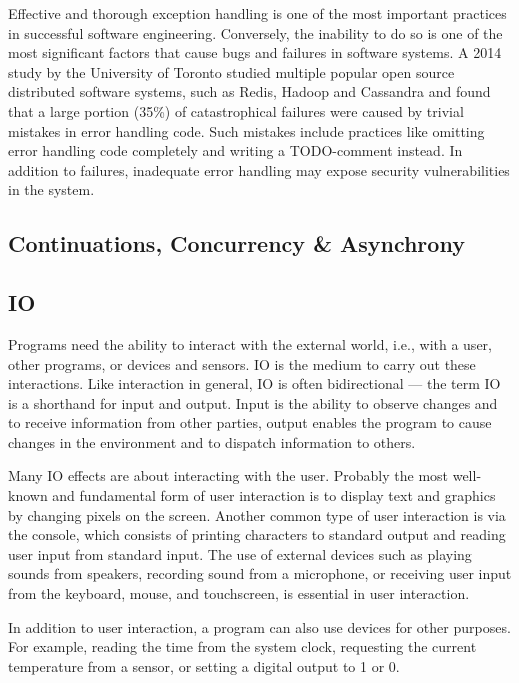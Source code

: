 Effective and thorough exception handling is one of the most important practices in successful software engineering. Conversely, the inability to do so is one of the most significant factors that cause bugs and failures in software systems. A 2014 study by the University of Toronto studied multiple popular open source distributed software systems, such as Redis, Hadoop and Cassandra and found that a large portion (35\%) of catastrophical failures were caused by trivial mistakes in error handling code. Such mistakes include practices like omitting error handling code completely and writing a TODO-comment instead. In addition to failures, inadequate error handling may expose security vulnerabilities in the system.~\cite{simple-testing-failures}


\subsection{Continuations, Concurrency \& Asynchrony}


\subsection{IO}
Programs need the ability to interact with the external world, i.e., with a user, other programs, or devices and sensors. IO is the medium to carry out these interactions. Like interaction in general, IO is often bidirectional --- the term IO is a shorthand for input and output. Input is the ability to observe changes and to receive information from other parties, output enables the program to cause changes in the environment and to dispatch information to others.

Many IO effects are about interacting with the user. Probably the most well-known and fundamental form of user interaction is to display text and graphics by changing pixels on the screen. Another common type of user interaction is via the console, which consists of printing characters to standard output and reading user input from standard input. The use of external devices such as playing sounds from speakers, recording sound from a microphone, or receiving user input from the keyboard, mouse, and touchscreen, is essential in user interaction.

In addition to user interaction, a program can also use devices for other purposes. For example, reading the time from the system clock, requesting the current temperature from a sensor, or setting a digital output to 1 or 0.

